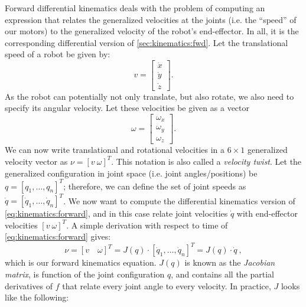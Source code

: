 Forward differential kinematics deals with the problem of computing an expression that relates the generalized velocities at the joints (i.e. the ``speed'' of our motors) to the generalized velocity of the robot's end-effector. In all, it is the corresponding differential version of \cref{sec:kinematics:fwd}.
Let the translational speed of a robot be given by:
\begin{equation}
v=\left[\begin{array}{c}
\dot{x}\\
\dot{y}\\
\dot{z}
\end{array}
\right].
\end{equation}
As the robot can potentially not only translate, but also rotate, we also need to specify its angular velocity. Let these velocities be given as a vector
\begin{equation}
\omega=\left[\begin{array}{c}
\omega_x\\
\omega_y\\
\omega_z
\end{array}
\right].
\end{equation}
We can now write translational and rotational velocities in a $6\times1$ generalized velocity vector as $\nu = [v \ \omega]^T$.
This notation is also called a \textsl{velocity twist}. %
Let the generalized configuration in joint space (i.e. joint angles/positions) be $q=[q_1, \ldots, q_n]^T$; therefore, we can define the set of joint speeds as $\dot{q}=[\dot{q}_1, \ldots, \dot{q}_n]^T$.
%
We now want to compute the differential kinematics version of \cref{eq:kinematics:forward}, and in this case relate joint velocities $\dot{q}$ with end-effector velocities $[v \ \omega]^T$. A simple derivation with respect to time of \cref{eq:kinematics:forward} gives:
\begin{equation}\label{eq:kinematics:diff:fwd:short}
\nu = [v \quad \omega]^T=J(q)\cdot [\dot{q}_1,\ldots,\dot{q}_n]^T = J(q) \cdot \dot{q} \ ,
\end{equation}
which is our forward kinematics equation. $J(q)$ is known as the \textsl{Jacobian matrix}, is function of the joint configuration $q$, and contains all the partial derivatives of $f$ that relate every joint angle to every velocity. In practice, $J$ looks like the following:

